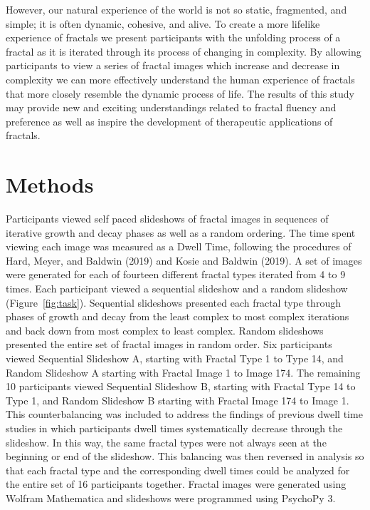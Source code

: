 \documentclass[english,jou]{apa6}
\begin{document}
However, our natural experience of the world is not so static, fragmented, and simple; it is often dynamic, cohesive, and alive. To create a more lifelike experience of fractals we present participants with the unfolding process of a fractal as it is iterated through its process of changing in complexity. By allowing participants to view a series of fractal images which increase and decrease in complexity we can more effectively understand the human experience of fractals that more closely resemble the dynamic process of life. The results of this study may provide new and exciting understandings related to fractal fluency and preference as well as inspire the development of therapeutic applications of fractals.

\hypertarget{methods}{%
\section{Methods}\label{methods}}

Participants viewed self paced slideshows of fractal images in sequences of iterative growth and decay phases as well as a random ordering. The time spent viewing each image was measured as a Dwell Time, following the procedures of Hard, Meyer, and Baldwin (2019) and Kosie and Baldwin (2019). A set of images were generated for each of fourteen different fractal types iterated from 4 to 9 times. Each participant viewed a sequential slideshow and a random slideshow (Figure~\ref{fig:task}). Sequential slideshows presented each fractal type through phases of growth and decay from the least complex to most complex iterations and back down from most complex to least complex. Random slideshows presented the entire set of fractal images in random order. Six participants viewed Sequential Slideshow A, starting with Fractal Type 1 to Type 14, and Random Slideshow A starting with Fractal Image 1 to Image 174. The remaining 10 participants viewed Sequential Slideshow B, starting with Fractal Type 14 to Type 1, and Random Slideshow B starting with Fractal Image 174 to Image 1. This counterbalancing was included to address the findings of previous dwell time studies in which participants dwell times systematically decrease through the slideshow. In this way, the same fractal types were not always seen at the beginning or end of the slideshow. This balancing was then reversed in analysis so that each fractal type and the corresponding dwell times could be analyzed for the entire set of 16 participants together. Fractal images were generated using Wolfram Mathematica and slideshows were programmed using PsychoPy 3.
\end{document}

